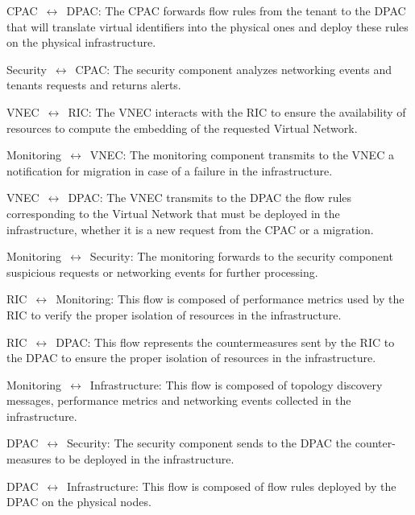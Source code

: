 CPAC~$\leftrightarrow$~DPAC: The CPAC forwards flow rules from the tenant to the DPAC that will translate virtual identifiers into the physical ones and deploy these rules on the physical infrastructure.

 Security~$\leftrightarrow$~CPAC: The security component analyzes networking events and tenants requests and returns alerts.

 VNEC~$\leftrightarrow$~RIC: The VNEC interacts with the RIC to ensure the availability of resources to compute the embedding of the requested Virtual Network.

 Monitoring~$\leftrightarrow$~VNEC: The monitoring component transmits to the VNEC a notification for migration in case of a failure in the infrastructure.

 VNEC~$\leftrightarrow$~DPAC: The VNEC transmits to the DPAC the flow rules corresponding to the Virtual Network that must be deployed in the infrastructure, whether it is a new request from the CPAC or a migration.

 Monitoring~$\leftrightarrow$~Security: The monitoring forwards to the security component suspicious requests or networking events for further processing.

 RIC~$\leftrightarrow$~Monitoring: This flow is composed of performance metrics used by the RIC to verify the proper isolation of resources in the infrastructure.

 RIC~$\leftrightarrow$~DPAC: This flow represents the countermeasures sent by the RIC to the DPAC to ensure the proper isolation of resources in the infrastructure.

 Monitoring~$\leftrightarrow$~Infrastructure: This flow is composed of topology discovery messages, performance metrics and networking events collected in the infrastructure.

 DPAC~$\leftrightarrow$~Security: The security component sends to the DPAC the counter-measures to be deployed in the infrastructure.

 DPAC~$\leftrightarrow$~Infrastructure: This flow is composed of flow rules deployed by the DPAC on the physical nodes.


